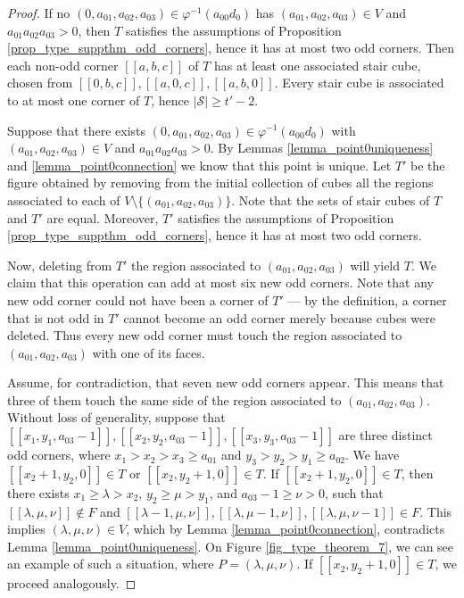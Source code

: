 \documentclass[12pt]{article}
\theoremstyle{remark}
\begin{document}
\begin{proof}

    If no $(0,a_{01},a_{02},a_{03}) \in \varphi^{-1}(a_{00}d_0)$ has $(a_{01},a_{02},a_{03}) \in V$ and $a_{01}a_{02}a_{03} > 0$, then $T$ satisfies the assumptions of Proposition \ref{prop_type_suppthm_odd_corners}, hence it has at most two odd corners. Then each non-odd corner $[[a,b,c]]$ of $T$ has at least one associated stair cube, chosen from $[[0,b,c]], [[a,0,c]],[[a,b,0]]$. Every stair cube is associated to at most one corner of $T$, hence $|\mathcal{S}| \geq t' -2$.
    
    
    Suppose that there exists $(0,a_{01},a_{02},a_{03}) \in \varphi^{-1}(a_{00}d_0)$ with $(a_{01},a_{02},a_{03}) \in V$ and $a_{01}a_{02}a_{03} > 0$. By Lemmas \ref{lemma_point0uniqueness} and \ref{lemma_point0connection} we know that this point is unique. Let $T'$ be the figure obtained by removing from the initial collection of cubes all the regions associated to each of $V \setminus \{ (a_{01},a_{02},a_{03})\}$. Note that the sets of stair cubes of $T$ and $T'$ are equal. Moreover, $T'$ satisfies the assumptions of Proposition \ref{prop_type_suppthm_odd_corners}, hence it has at most two odd corners.

    

    Now, deleting from $T'$ the region associated to $(a_{01},a_{02},a_{03})$ will yield $T$. We claim that this operation can add at most six new odd corners. Note that any new odd corner could not have been a corner of $T'$ --- by the definition, a corner that is not odd in $T'$ cannot become an odd corner merely because cubes were deleted. Thus every new odd corner must touch the region associated to $(a_{01},a_{02},a_{03})$ with one of its faces.

    Assume, for contradiction, that seven new odd corners appear. This means that three of them touch the same side of the region associated to $(a_{01},a_{02},a_{03})$. Without loss of generality, suppose that $[[x_1,y_1,a_{03}-1]], [[x_2,y_2,a_{03}-1]], [[x_3,y_3,a_{03}-1]]$ are three distinct odd corners, where $x_1 > x_2 > x_3 \geq a_{01}$ and $y_3 > y_2 > y_1 \geq a_{02}$. We have $[[x_2+1,y_2,0]] \in T$ or $[[x_2,y_2+1,0]] \in T$. If $[[x_2+1,y_2,0]] \in T$, then there exists $x_1 \geq \lambda > x_2$, $y_2 \geq  \mu > y_1$, and $a_{03}-1 \geq \nu > 0$, such that $[[\lambda,\mu,\nu]] \notin F$ and $[[\lambda-1,\mu,\nu]],[[\lambda,\mu-1,\nu]],[[\lambda,\mu,\nu-1]] \in F$. This implies $(\lambda,\mu,\nu) \in V$, which by Lemma \ref{lemma_point0connection}, contradicts Lemma \ref{lemma_point0uniqueness}. On Figure \ref{fig_type_theorem_7}, we can see an example of such a situation, where $P = (\lambda,\mu,\nu)$. If $[[x_2,y_2+1,0]] \in T$, we proceed analogously.


\end{proof}
\end{document}
